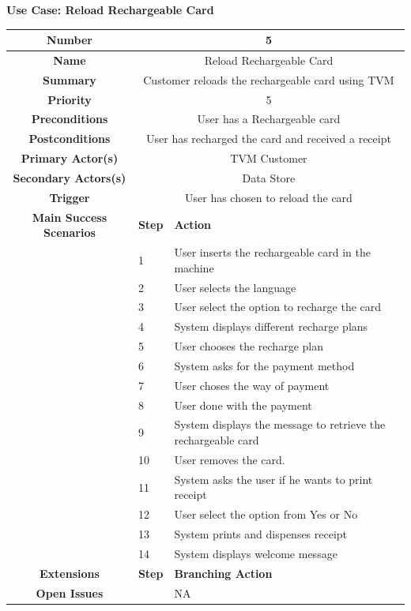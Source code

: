\documentclass[a4paper,12pt]{report}
\begin{document}
\vspace{0.5cm}
\textbf{\large Use Case: Reload Rechargeable Card}
\\

\begin{tabular}{ | c | p{2cm} | p{7cm} |}
	
	\hline
	\textbf{Number} & \multicolumn{2}{c|}{5}  \\
	\hline
	\textbf{Name} & \multicolumn{2}{c|}{Reload Rechargeable Card}  \\
	\hline
	\textbf{Summary} & \multicolumn{2}{c|}{Customer reloads the rechargeable card using TVM}  \\
	\hline
	\textbf{Priority} & \multicolumn{2}{c|}{5}  \\
	\hline
	\textbf{Preconditions} & \multicolumn{2}{c|}{User has a Rechargeable card}  \\
	\hline
	\textbf{Postconditions} & \multicolumn{2}{c|}{User has recharged the card and received a receipt}  \\
	\hline
	\textbf{Primary Actor(s)} & \multicolumn{2}{c|}{TVM Customer}  \\
	\hline
	\textbf{Secondary Actors(s)} & \multicolumn{2}{c|}{Data Store}  \\
	\hline
	\textbf{Trigger} & \multicolumn{2}{c|}{User has chosen to reload the card}  \\
	\hline
	\textbf{Main Success Scenarios} & \textbf{Step} & \textbf{Action} \\
	\hline
	& 1 & User inserts the rechargeable card in the machine \\ 
	\hline
	&  2  & User selects the language \\
	\hline
	&  3  & User select the option to recharge the card \\
	\hline
	&  4  & System displays different recharge plans \\
	\hline
	&  5  & User chooses the recharge plan \\
	\hline
	&  6  & System asks for the payment method \\
	\hline
	&  7  & User choses the way of payment \\
	\hline
	&  8  & User done with the payment \\
	\hline
	&  9  & System displays the message to retrieve the rechargeable card \\
	\hline
	&  10  & User removes the card. \\
	\hline
	&  11  & System asks the user if he wants to print receipt \\
	\hline
	&  12  & User select the option from Yes or No \\
	\hline
	&  13  & System prints and dispenses receipt \\
	\hline
	&  14  & System displays welcome message \\
	\hline
	
	\textbf{Extensions} & \textbf{Step} & \textbf{Branching Action} \\
	\hline
	\textbf{Open Issues} &    & NA \\
	\hline
	
\end{tabular}
\end{document}
